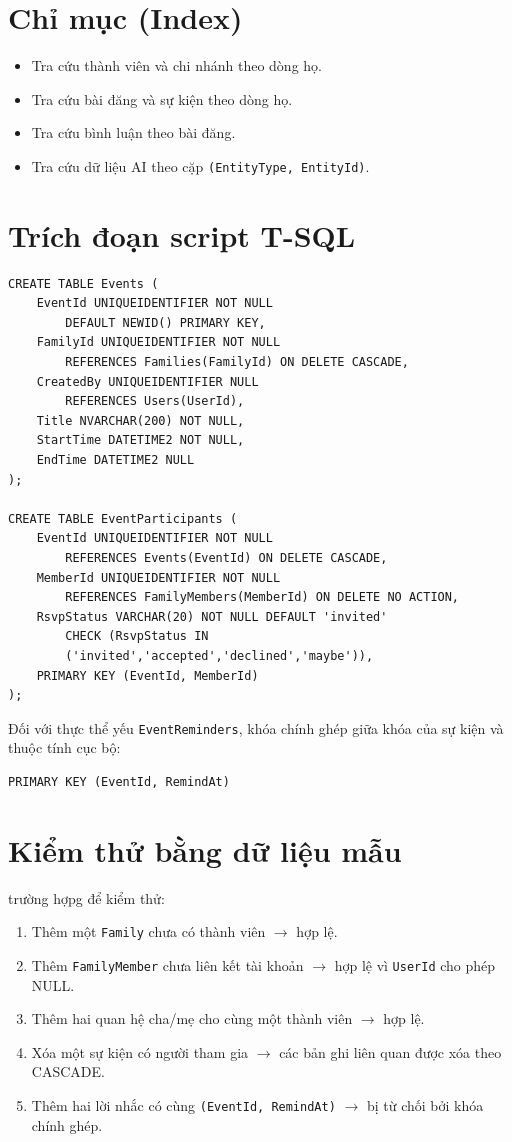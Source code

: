 \section{Chỉ mục (Index)}

\begin{itemize}
    \item Tra cứu thành viên và chi nhánh theo dòng họ.
    \item Tra cứu bài đăng và sự kiện theo dòng họ.
    \item Tra cứu bình luận theo bài đăng.
    \item Tra cứu dữ liệu AI theo cặp \texttt{(EntityType, EntityId)}.
\end{itemize}
\section{Trích đoạn script T-SQL}
\begin{infobox}
\begin{verbatim}
CREATE TABLE Events (
    EventId UNIQUEIDENTIFIER NOT NULL
        DEFAULT NEWID() PRIMARY KEY,
    FamilyId UNIQUEIDENTIFIER NOT NULL
        REFERENCES Families(FamilyId) ON DELETE CASCADE,
    CreatedBy UNIQUEIDENTIFIER NULL
        REFERENCES Users(UserId),
    Title NVARCHAR(200) NOT NULL,
    StartTime DATETIME2 NOT NULL,
    EndTime DATETIME2 NULL
);

CREATE TABLE EventParticipants (
    EventId UNIQUEIDENTIFIER NOT NULL
        REFERENCES Events(EventId) ON DELETE CASCADE,
    MemberId UNIQUEIDENTIFIER NOT NULL
        REFERENCES FamilyMembers(MemberId) ON DELETE NO ACTION,
    RsvpStatus VARCHAR(20) NOT NULL DEFAULT 'invited'
        CHECK (RsvpStatus IN
        ('invited','accepted','declined','maybe')),
    PRIMARY KEY (EventId, MemberId)
);
\end{verbatim}
\end{infobox}
Đối với thực thể yếu \texttt{EventReminders}, khóa chính ghép giữa khóa của sự kiện và thuộc tính cục bộ:
\begin{verbatim}
PRIMARY KEY (EventId, RemindAt)
\end{verbatim}
\section{Kiểm thử bằng dữ liệu mẫu}
trường hợpg để kiểm thử:
\begin{enumerate}
    \item Thêm một \texttt{Family} chưa có thành viên $\rightarrow$ hợp lệ.
    \item Thêm \texttt{FamilyMember} chưa liên kết tài khoản $\rightarrow$ hợp lệ vì \texttt{UserId} cho phép NULL.
    \item Thêm hai quan hệ cha/mẹ cho cùng một thành viên $\rightarrow$ hợp lệ.
    \item Xóa một sự kiện có người tham gia $\rightarrow$ các bản ghi liên quan được xóa theo CASCADE.
    \item Thêm hai lời nhắc có cùng \texttt{(EventId, RemindAt)} $\rightarrow$ bị từ chối bởi khóa chính ghép.
\end{enumerate}
